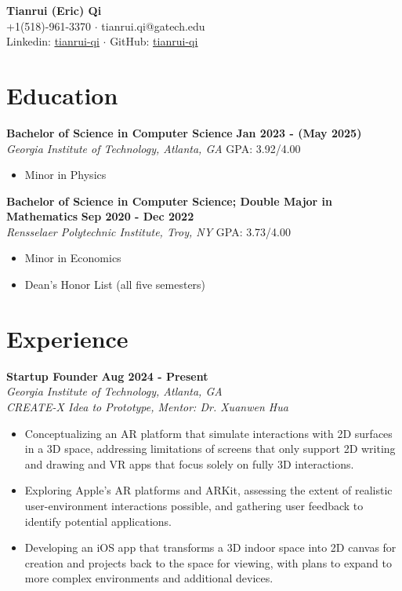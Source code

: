 \documentclass[letterpaper, 10pt]{article}
\newcommand{\subsectionvspace}{\vspace{6pt}}
\begin{document}
\begin{center}
    \textbf{\LARGE Tianrui (Eric) Qi} \\
    +1(518)-961-3370 
    $\cdot$ 
    tianrui.qi@gatech.edu \\ 
    Linkedin: \href{https://www.linkedin.com/in/tianrui-qi/}{\underline{tianrui-qi}} 
    $\cdot$ 
    GitHub: \href{https://github.com/tianrui-qi}{\underline{tianrui-qi}}
\end{center}


\section{Education}


    \textbf{Bachelor of Science in Computer Science} \hfill 
    \textbf{Jan 2023 - (May 2025)} \\
    \textit{Georgia Institute of Technology, Atlanta, GA} \hfill 
    GPA: 3.92/4.00
    \begin{itemize}
        \item Minor in Physics
    \end{itemize}

    \subsectionvspace

    \textbf{Bachelor of Science in Computer Science; Double Major in Mathematics} \hfill 
    \textbf{Sep 2020 - Dec 2022} \\
    \textit{Rensselaer Polytechnic Institute, Troy, NY} \hfill 
    GPA: 3.73/4.00 
    \begin{itemize}
        \item Minor in Economics
        \item Dean's Honor List (all five semesters)
    \end{itemize}


\section{Experience}


    \textbf{Startup Founder} \hfill 
    \textbf{Aug 2024 - Present} \\
    \textit{Georgia Institute of Technology, Atlanta, GA} \\
    \textit{CREATE-X Idea to Prototype, Mentor: Dr. Xuanwen Hua}
    \begin{itemize}
        \item Conceptualizing an AR platform that simulate interactions with 2D surfaces in a 3D space, addressing limitations of screens that only support 2D writing and drawing and VR apps that focus solely on fully 3D interactions.
        \item Exploring Apple's AR platforms and ARKit, assessing the extent of realistic user-environment interactions possible, and gathering user feedback to identify potential applications. 
        \item Developing an iOS app that transforms a 3D indoor space into 2D canvas for creation and projects back to the space for viewing, with plans to expand to more complex environments and additional devices.
    \end{itemize}
\end{document}
